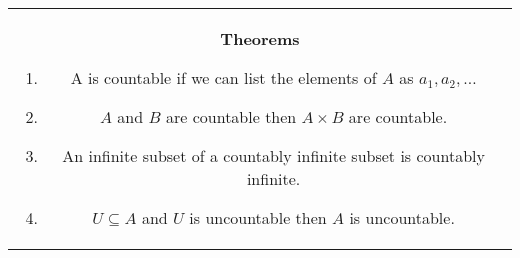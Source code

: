\documentclass[a4paper]{article}
\begin{document}
\begin{tabular}{@{}c@{}}
\begin{minipage}[t][\paperheight][t]{0.49\paperwidth}
        \textbf{Theorems}
        \begin{enumerate}
            \item A is countable if we can list the elements of $A$ as $a_1,a_2,\dots$
            \item $A$ and $B$ are countable then $A \times  B$ are countable. 
            \item An infinite subset of a countably infinite subset is countably infinite.
            \item $U \subseteq A$ and  $U$ is uncountable  then $A$ is uncountable.
        \end{enumerate}



        
        
    \end{minipage}%
    \end{tabular}%
\end{document}
